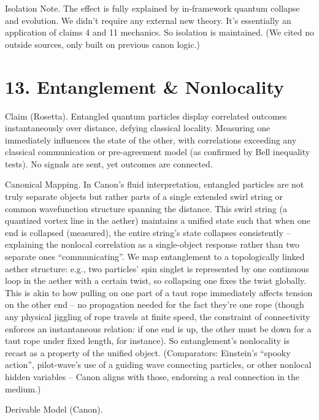 \documentclass[11pt]{article}
\begin{document}
Isolation Note. The effect is fully explained by in-framework quantum collapse and evolution. We didn't require any external new theory. It's essentially an application of claims 4 and 11 mechanics. So isolation is maintained. (We cited no outside sources, only built on previous canon logic.)


\section*{13. Entanglement & Nonlocality}

Claim (Rosetta). Entangled quantum particles display correlated outcomes instantaneously over distance, defying classical locality. Measuring one immediately influences the state of the other, with correlations exceeding any classical communication or pre-agreement model (as confirmed by Bell inequality tests). No signals are sent, yet outcomes are connected.


Canonical Mapping. In Canon’s fluid interpretation, entangled particles are not truly separate objects but rather parts of a single extended swirl string or common wavefunction structure spanning the distance. This swirl string (a quantized vortex line in the aether) maintains a unified state such that when one end is collapsed (measured), the entire string’s state collapses consistently – explaining the nonlocal correlation as a single-object response rather than two separate ones “communicating”. We map entanglement to a topologically linked aether structure: e.g., two particles’ spin singlet is represented by one continuous loop in the aether with a certain twist, so collapsing one fixes the twist globally. This is akin to how pulling on one part of a taut rope immediately affects tension on the other end – no propagation needed for the fact they’re one rope (though any physical jiggling of rope travels at finite speed, the constraint of connectivity enforces an instantaneous relation: if one end is up, the other must be down for a taut rope under fixed length, for instance). So entanglement’s nonlocality is recast as a property of the unified object. (Comparators: Einstein’s “spooky action”, pilot-wave’s use of a guiding wave connecting particles, or other nonlocal hidden variables – Canon aligns with those, endorsing a real connection in the medium.)


Derivable Model (Canon).
\end{document}
